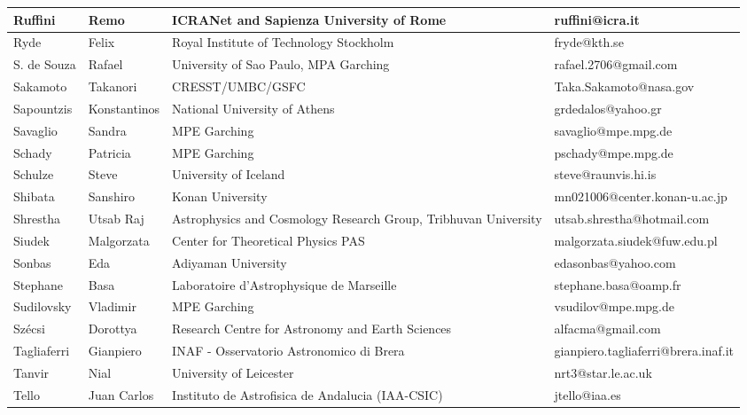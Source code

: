 \begin{center}
\begin{longtable}{|p{1.6cm} |p{1.6cm} |p{2cm} |p{3cm} |}
\tiny Ruffini &\tiny Remo & \tiny ICRANet and Sapienza University of Rome & \tiny ruffini@icra.it \\ \hline
\tiny Ryde &\tiny Felix & \tiny Royal Institute of Technology Stockholm & \tiny fryde@kth.se \\ \hline
\tiny S. de Souza &\tiny Rafael & \tiny University of Sao Paulo, MPA Garching & \tiny rafael.2706@gmail.com \\ \hline
\tiny Sakamoto &\tiny Takanori & \tiny CRESST/UMBC/GSFC & \tiny Taka.Sakamoto@nasa.gov \\ \hline
\tiny Sapountzis &\tiny Konstantinos & \tiny National University of Athens & \tiny grdedalos@yahoo.gr \\ \hline
\tiny Savaglio &\tiny Sandra & \tiny MPE Garching & \tiny savaglio@mpe.mpg.de \\ \hline
\tiny Schady &\tiny Patricia & \tiny MPE Garching & \tiny pschady@mpe.mpg.de \\ \hline
\tiny Schulze &\tiny Steve & \tiny University of Iceland & \tiny steve@raunvis.hi.is \\ \hline
\tiny Shibata &\tiny Sanshiro & \tiny Konan University & \tiny mn021006@center.konan-u.ac.jp \\ \hline
\tiny Shrestha &\tiny Utsab Raj & \tiny Astrophysics and Cosmology Research Group, Tribhuvan University & \tiny utsab.shrestha@hotmail.com \\ \hline
\tiny Siudek &\tiny Malgorzata & \tiny Center for Theoretical Physics PAS & \tiny malgorzata.siudek@fuw.edu.pl \\ \hline
\tiny Sonbas &\tiny Eda & \tiny Adiyaman University & \tiny edasonbas@yahoo.com \\ \hline
\tiny Stephane &\tiny Basa & \tiny Laboratoire d'Astrophysique de Marseille & \tiny stephane.basa@oamp.fr \\ \hline
\tiny Sudilovsky &\tiny Vladimir & \tiny MPE Garching & \tiny vsudilov@mpe.mpg.de \\ \hline
\tiny Sz\'ecsi &\tiny Dorottya & \tiny Research Centre for Astronomy and Earth Sciences & \tiny alfacma@gmail.com \\ \hline
\tiny Tagliaferri &\tiny Gianpiero & \tiny INAF - Osservatorio Astronomico di Brera & \tiny gianpiero.tagliaferri@brera.inaf.it \\ \hline
\tiny Tanvir &\tiny Nial & \tiny University of Leicester & \tiny nrt3@star.le.ac.uk \\ \hline
\tiny Tello &\tiny Juan Carlos & \tiny Instituto de Astrofisica de Andalucia (IAA-CSIC) & \tiny jtello@iaa.es \\ \hline

\end{longtable}
\end{center}

